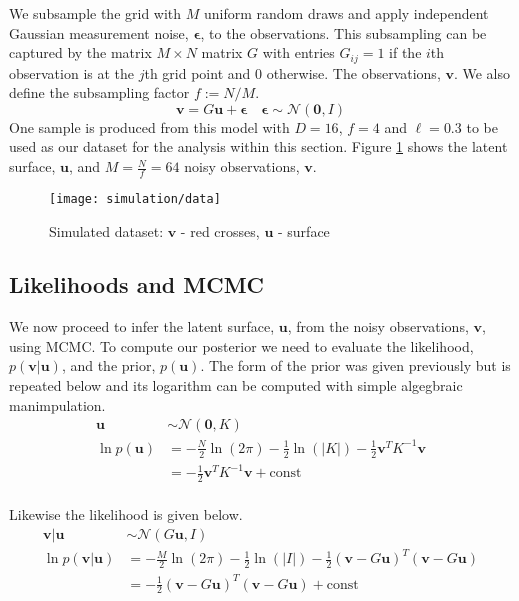 \documentclass[11pt]{article}
\begin{document}
We subsample the grid with $M$ uniform random draws and apply independent Gaussian measurement noise, $\boldsymbol{\epsilon}$, to the observations. This subsampling can be captured by the matrix $M \times N$ matrix $G$ with entries $G_{ij} = 1$ if the $i$th observation is at the $j$th grid point and $0$ otherwise. The observations, $\boldsymbol{v}$. We also define the subsampling factor $f := N/M$. 
\begin{equation}
    \boldsymbol{v} = G\boldsymbol{u} + \boldsymbol{\epsilon} \quad \boldsymbol{\epsilon} \sim \mathcal{N}(\boldsymbol{0}, I)
\end{equation}
One sample is produced from this model with $D=16$, $f=4$ and $\ell=0.3$ to be used as our dataset for the analysis within this section. Figure \ref{fig:dataset} shows the latent surface, $\boldsymbol{u}$, and $M = \frac{N}{f} = 64$ noisy observations, $\boldsymbol{v}$. 

\begin{figure}
    \centering
    \texttt{[image: simulation/data]}
    \caption{Simulated dataset: $\boldsymbol{v}$ - red crosses, $\boldsymbol{u}$ - surface}
    \label{fig:dataset}
\end{figure}

\subsection{Likelihoods and MCMC}
We now proceed to infer the latent surface, $\boldsymbol{u}$, from the noisy observations, $\boldsymbol{v}$, using MCMC. To compute our posterior we need to evaluate the likelihood, $p(\boldsymbol{v} | \boldsymbol{u})$, and the prior, $p(\boldsymbol{u})$. The form of the prior was given previously but is repeated below and its logarithm can be computed with simple algegbraic manimpulation.
\begin{equation}
    \begin{aligned}
        \boldsymbol{u} &\sim \mathcal{N}(\boldsymbol{0}, K) \\
        \ln p(\boldsymbol{u}) &= - \frac{N}{2}\ln(2\pi) - \frac{1}{2}\ln(|K|) - \frac{1}{2} \boldsymbol{v}^T K^{-1} \boldsymbol{v} \\
          &= - \frac{1}{2} \boldsymbol{v}^T K^{-1} \boldsymbol{v} + \text{const} \\
    \end{aligned}
\end{equation}

Likewise the likelihood is given below.
\begin{equation}
    \begin{aligned}
        \boldsymbol{v} | \boldsymbol{u} &\sim \mathcal{N}(G\boldsymbol{u}, I) \\
        \ln p(\boldsymbol{v} | \boldsymbol{u}) &= - \frac{M}{2}\ln(2\pi) - \frac{1}{2}\ln(|I|) - \frac{1}{2}(\boldsymbol{v} - G\boldsymbol{u})^T (\boldsymbol{v} - G\boldsymbol{u}) \\
          &= - \frac{1}{2}(\boldsymbol{v} - G\boldsymbol{u})^T (\boldsymbol{v} - G\boldsymbol{u}) + \text{const} \\
    \end{aligned}
\end{equation}
\end{document}
